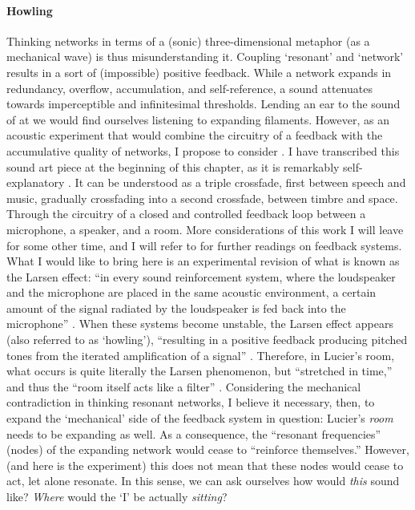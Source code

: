\paragraph{Howling}
Thinking networks in terms of a (sonic) three-dimensional metaphor (as a mechanical wave) is thus misunderstanding it. Coupling `resonant' and `network' results in a sort of (impossible) positive feedback. While a network expands in redundancy, overflow, accumulation, and self-reference, a sound attenuates towards imperceptible and infinitesimal thresholds. Lending an ear to the sound of \gls{at} we would find ourselves listening to expanding filaments. However, as an acoustic experiment that would combine the circuitry of a feedback with the accumulative quality of networks, I propose to consider  . I have transcribed this sound art piece at the beginning of this chapter, as it is remarkably self-explanatory . It can be understood as a triple crossfade, first between speech and music, gradually crossfading into a second crossfade, between timbre and space. Through the circuitry of a closed and controlled feedback loop between a microphone, a speaker, and a room. More considerations of this work I will leave for some other time, and I will refer to \textcite{icmc/bbp2372.2012.006} for further readings on feedback systems. What I would like to bring here is an experimental revision of what is known as the Larsen effect: ``in every sound reinforcement system, where the loudspeaker and the microphone are placed in the same acoustic environment, a certain amount of the signal radiated by the loudspeaker is fed back into the microphone'' \parencite[11]{Kro11:Aco}. When these systems become unstable, the Larsen effect appears (also referred to as `howling'), ``resulting in a positive feedback producing pitched tones from the iterated amplification of a signal'' \parencite[31]{icmc/bbp2372.2012.006}. Therefore, in Lucier's room, what occurs is quite literally the Larsen phenomenon, but ``stretched in time,'' and thus the ``room itself acts like a filter'' \parencite[34]{icmc/bbp2372.2012.006}. Considering the mechanical contradiction in thinking resonant networks, I believe it necessary, then, to expand the `mechanical' side of the feedback system in question: Lucier's \textit{room} needs to be expanding as well. As a consequence, the ``resonant frequencies'' (nodes) of the expanding network would cease to ``reinforce themselves.'' However, (and here is the experiment) this does not mean that these nodes would cease to act, let alone resonate. In this sense, we can ask ourselves how would \textit{this} sound like? \textit{Where} would the `I' be actually \textit{sitting}?

